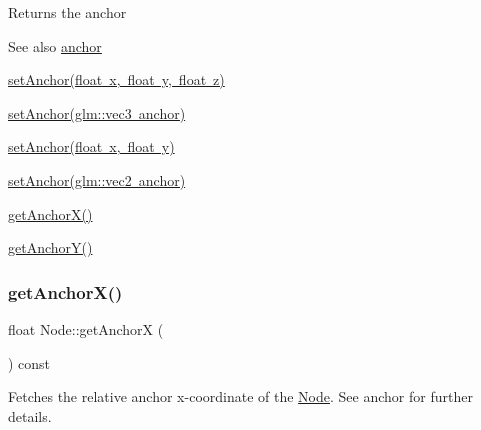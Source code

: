 \begin{DoxyReturn}{Returns}
the anchor 
\end{DoxyReturn}
\begin{DoxySeeAlso}{See also}
\mbox{\hyperlink{classsage_1_1Node_a8698d732514fa2caba0ccee46dbae17a}{anchor}} 

\mbox{\hyperlink{classsage_1_1Node_a04d15cec594320725e6ef44756346d2a}{set\+Anchor(float x, float y, float z)}} 

\mbox{\hyperlink{classsage_1_1Node_a96a786cd6d6750d60c8195aa4895de7c}{set\+Anchor(glm\+::vec3 anchor)}} 

\mbox{\hyperlink{classsage_1_1Node_a8813a645a74f6ab59b25d434e65035c6}{set\+Anchor(float x, float y)}} 

\mbox{\hyperlink{classsage_1_1Node_a957a7e578660950b8518926239397ea0}{set\+Anchor(glm\+::vec2 anchor)}} 

\mbox{\hyperlink{classsage_1_1Node_aa5f31c33d60b32b618d3beaf4e5c6c51}{get\+Anchor\+X()}} 

\mbox{\hyperlink{classsage_1_1Node_a78c5f86d0081854603178fb52d8c0a9b}{get\+Anchor\+Y()}} 
\end{DoxySeeAlso}
\mbox{\label{classsage_1_1Node_aa5f31c33d60b32b618d3beaf4e5c6c51}} 
\subsubsection{\texorpdfstring{getAnchorX()}{getAnchorX()}}
{\footnotesize\ttfamily float Node\+::get\+AnchorX (\begin{DoxyParamCaption}{ }\end{DoxyParamCaption}) const}



Fetches the relative anchor x-\/coordinate of the \mbox{\hyperlink{classsage_1_1Node}{Node}}. See anchor for further details. 

